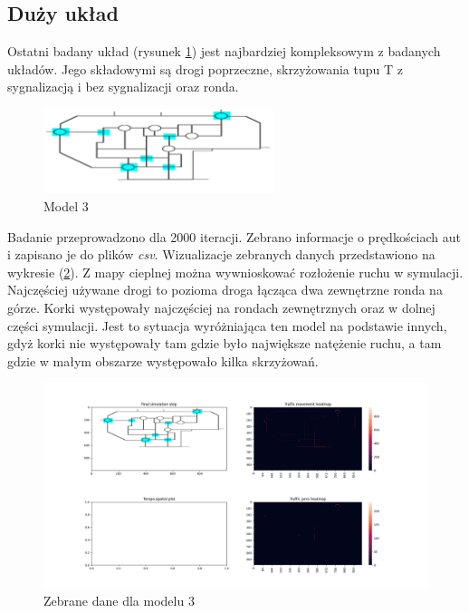 \documentclass{article}
\begin{document}
\subsection{Duży układ}

Ostatni badany układ (rysunek \ref{fig:model_duzy}) jest najbardziej kompleksowym z badanych układów. Jego składowymi są drogi poprzeczne, skrzyżowania tupu T z sygnalizacją i bez sygnalizacji oraz ronda. 

\begin{figure}[H]
    \centering
    \includegraphics[width=0.6\textwidth]{images/modele/large.png}
    \caption{Model 3}
    \label{fig:model_duzy}
\end{figure}

Badanie przeprowadzono dla 2000 iteracji. Zebrano informacje o prędkościach aut i zapisano je do plików \emph{csv}. Wizualizacje zebranych danych przedstawiono na wykresie (\ref{fig:dane_duzy}). Z mapy cieplnej można wywnioskować rozłożenie ruchu w symulacji. Najczęściej używane drogi to pozioma droga łącząca dwa zewnętrzne ronda na górze. Korki występowały najczęściej na rondach zewnętrznych oraz w dolnej części symulacji. Jest to sytuacja wyróżniająca ten model na podstawie innych, gdyż korki nie występowały tam gdzie było największe natężenie ruchu, a tam gdzie w małym obszarze występowało kilka skrzyżowań.

\begin{figure}[H]
    \centering
    \includegraphics[width=1\textwidth]{images/5000_210.png}
    \caption{Zebrane dane dla modelu 3}
    \label{fig:dane_duzy}
\end{figure}
\end{document}
